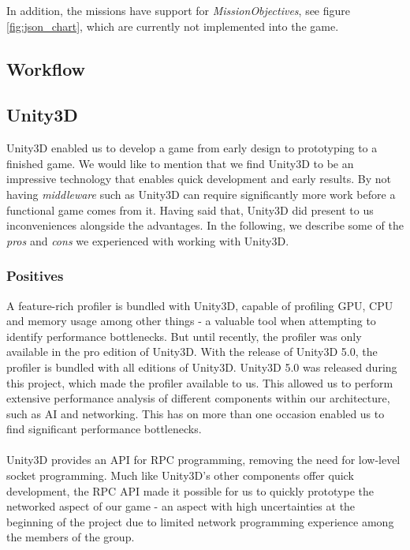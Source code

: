 In addition, the missions have support for \textit{MissionObjectives}, see figure \ref{fig:json_chart}, which are currently not implemented into the game.

\subsection{Workflow}

\subsection{Unity3D}
Unity3D enabled us to develop a game from early design to prototyping to a
finished game. We would like to mention that we find Unity3D to be an
impressive technology that enables quick development and early results. By not
having \textit{middleware} such as Unity3D can require significantly more work
before a functional game comes from it.
Having said that, Unity3D did present to us inconveniences alongside the
advantages. In the following, we describe some of the \textit{pros} and
\textit{cons} we experienced with working with Unity3D.

\subsubsection*{Positives}
A feature-rich profiler is bundled with Unity3D, capable of profiling GPU, CPU
and memory usage among other things - a valuable tool when attempting to
identify performance bottlenecks. But until recently, the profiler was only
available in the pro edition of Unity3D. With the release of Unity3D 5.0, the
profiler is bundled with all editions of Unity3D. Unity3D 5.0 was released
during this project, which made the profiler available to us. This allowed us
to perform extensive performance analysis of different components within our
architecture, such as AI and networking. This has on more than one occasion
enabled us to find significant performance bottlenecks.
\\
\\
Unity3D provides an API for RPC programming, removing the need for low-level
socket programming. Much like Unity3D's other components offer quick
development, the RPC API made it possible for us to quickly prototype the
networked aspect of our game - an aspect with high uncertainties at the
beginning of the project due to limited network programming experience
among the members of the group.

